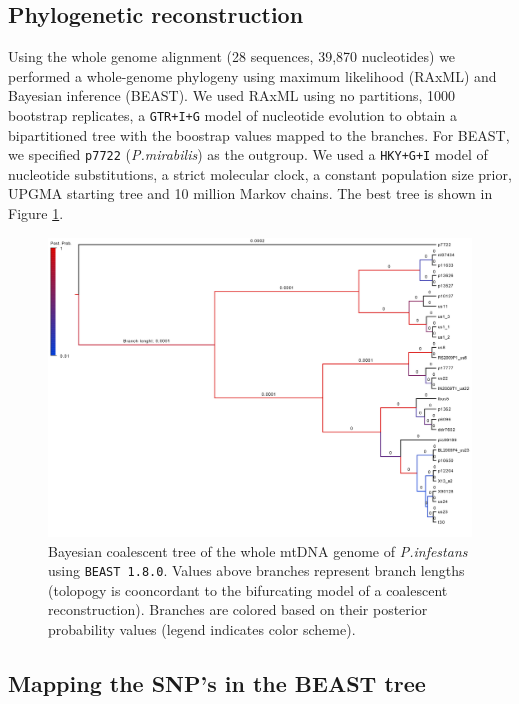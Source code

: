 \documentclass{article}\usepackage[]{graphicx}\usepackage[]{color}
\begin{document}
\subsection{Phylogenetic reconstruction}
Using the whole genome alignment (28 sequences, 39,870 nucleotides) we performed a whole-genome phylogeny using maximum likelihood (RAxML) and Bayesian inference (BEAST). We used RAxML using no partitions, 1000 bootstrap replicates, a \texttt{GTR+I+G} model of nucleotide evolution to obtain a bipartitioned tree with the boostrap values mapped to the branches. For BEAST, we specified \texttt{p7722} (\emph{P.mirabilis}) as the outgroup. We used a \texttt{HKY+G+I} model of nucleotide substitutions, a strict molecular clock, a constant population size prior, UPGMA starting tree and 10 million Markov chains. The best tree is shown in Figure \ref{fig:BEAST}.

\begin{figure}[p]
\centering
\includegraphics[scale=0.08]{Beast_branchlenghts.jpg}
\caption[BEAST Coalescent tree]{Bayesian coalescent tree of the whole mtDNA genome of \emph{P.infestans} using \texttt{BEAST 1.8.0}. Values above branches represent branch lengths (tolopogy is cooncordant to the bifurcating model of a coalescent reconstruction). Branches are colored based on their posterior probability values (legend indicates color scheme).}
\label{fig:BEAST}
\end{figure}

\subsection{Mapping the SNP's in the BEAST tree}
\end{document}
